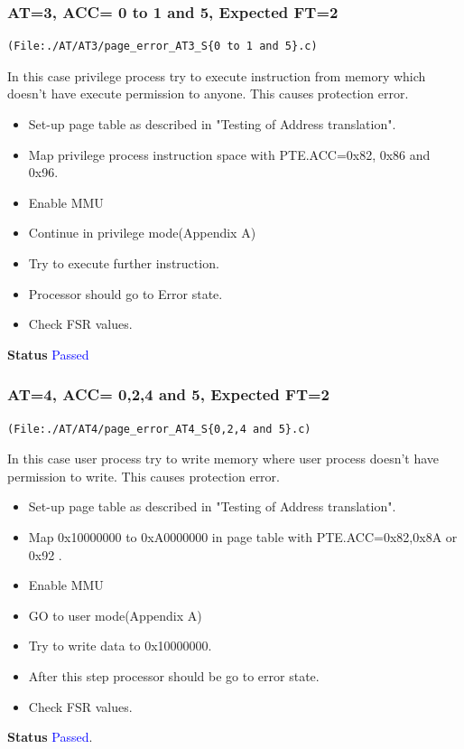 \documentclass[12pt,a4paper]{article}
\begin{document}
\subsubsection{ AT=3, ACC= 0 to 1 and 5, Expected FT=2}
\begin{lstlisting}
(File:./AT/AT3/page_error_AT3_S{0 to 1 and 5}.c)
\end{lstlisting}
In this case privilege process try to execute instruction from memory which doesn't have execute permission to anyone. This causes protection error.

\begin{itemize}
\item Set-up page table as described in "Testing of Address translation".
\item Map privilege process instruction space with PTE.ACC=0x82, 0x86 and 0x96. 
\item Enable MMU
\item Continue in privilege mode(Appendix A) 
\item Try to execute further instruction. 
\item Processor should go to Error state. 
\item Check FSR values.
\end{itemize}
\textbf{Status} \textcolor{blue}{Passed}
\subsubsection{ AT=4, ACC= 0,2,4 and 5, Expected FT=2}
\begin{lstlisting}
(File:./AT/AT4/page_error_AT4_S{0,2,4 and 5}.c)
\end{lstlisting}
In this case user process try to write memory where user process doesn't have permission to write. This causes protection error.

\begin{itemize}
\item Set-up page table as described in "Testing of Address translation".
\item Map 0x10000000 to 0xA0000000 in page table with PTE.ACC=0x82,0x8A or 0x92  .
\item Enable MMU
\item GO to user mode(Appendix A) 
\item Try to write data to 0x10000000.
\item After this step processor should be go to error state.
\item Check FSR values.
\end{itemize}
\textbf{Status} \textcolor{blue}{Passed}.
\end{document}
